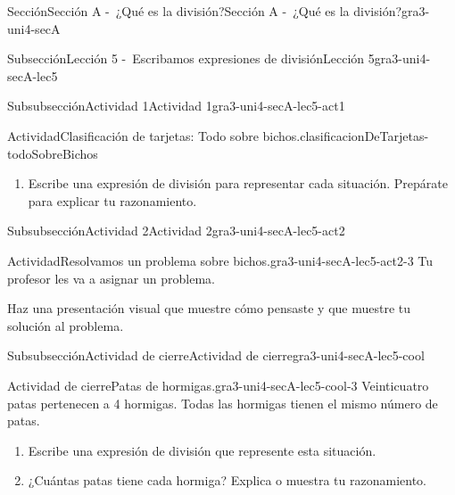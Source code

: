 \documentclass[twoside,10pt,]{article}
\begin{document}
\begin{sectionptx}{Sección}{Sección A -~¿Qué es la división?}{}{Sección A -~¿Qué es la división?}{}{}{gra3-uni4-secA}
\begin{subsectionptx}{Subsección}{Lección 5 -~Escribamos expresiones de división}{}{Lección 5}{}{}{gra3-uni4-secA-lec5}
\begin{subsubsectionptx}{Subsubsección}{Actividad 1}{}{Actividad 1}{}{}{gra3-uni4-secA-lec5-act1}
\begin{activity}{Actividad}{Clasificación de tarjetas: Todo sobre bichos.}{clasificacionDeTarjetas-todoSobreBichos}
\begin{enumerate}
\begin{enumerate}[label=(\Alph*)]
\item{}Hay 12 alas. Si cada libélula tiene 4 alas, ¿cuántas libélulas hay?%
\item{}Treinta patas pertenecen a 5 hormigas. Si todas las hormigas tienen el mismo número de patas, ¿cuántas patas tiene cada hormiga?%
\item{}En total, hay 50 manchas en 5 mariposas. Si todas las mariposas tienen el mismo número de manchas, ¿cuántas manchas tiene cada mariposa?%
\end{enumerate}
\item{}Escribe una expresión de división para representar cada situación. Prepárate para explicar tu razonamiento.%
\end{enumerate}
\end{activity}%
%
\end{subsubsectionptx}
%
%
\typeout{************************************************}
\typeout{************************************************}
%
\begin{subsubsectionptx}{Subsubsección}{Actividad 2}{}{Actividad 2}{}{}{gra3-uni4-secA-lec5-act2}
\begin{activity}{Actividad}{Resolvamos un problema sobre bichos.}{gra3-uni4-secA-lec5-act2-3}%
Tu profesor les va a asignar un problema.%
\par
Haz una presentación visual que muestre cómo pensaste y que muestre tu solución al problema.%
\end{activity}%
\end{subsubsectionptx}
%
%
\typeout{************************************************}
\typeout{************************************************}
%
\begin{subsubsectionptx}{Subsubsección}{Actividad de cierre}{}{Actividad de cierre}{}{}{gra3-uni4-secA-lec5-cool}
\begin{project}{Actividad de cierre}{Patas de hormigas.}{gra3-uni4-secA-lec5-cool-3}%
Veinticuatro patas pertenecen a 4 hormigas. Todas las hormigas tienen el mismo número de patas.%
\par
%
\begin{enumerate}
\item{}Escribe una expresión de división que represente esta situación.%
\item{}¿Cuántas patas tiene cada hormiga? Explica o muestra tu razonamiento.%

\end{enumerate}
\end{project}
\end{subsubsectionptx}
\end{subsectionptx}
\end{sectionptx}
\end{document}
